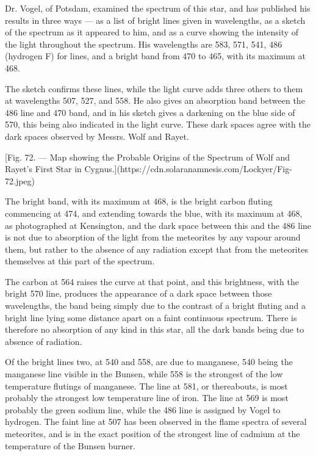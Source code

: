 \documentclass[a4paper, 12pt, oneside, polutonikogreek, english]{article}
\begin{document}
Dr. Vogel, of Potsdam, examined the spectrum of this star, and has published his results in three ways --- as a list of bright lines given in wavelengths, as a sketch of the spectrum as it appeared to him, and as a curve showing the intensity of the light throughout the spectrum. His wavelengths are 583, 571, 541, 486 (hydrogen F) for lines, and a bright band from 470 to 465, with its maximum at 468.

The sketch confirms these lines, while the light curve adds three others to them at wavelengths 507, 527, and 558. He also gives an absorption band between the 486 line and 470 band, and in his sketch gives a darkening on the blue side of 570, this being also indicated in the light curve. These dark spaces agree with the dark spaces observed by Messrs. Wolf and Rayet.

[Fig. 72. --- Map showing the Probable Origins of the Spectrum of Wolf and Rayet's First Star in Cygnus.](https://cdn.solaranamnesis.com/Lockyer/Fig-72.jpeg)

The bright band, with its maximum at 468, is the bright carbon fluting commencing at 474, and extending towards the blue, with its maximum at 468, as photographed at Kensington, and the dark space between this and the 486 line is not due to absorption of the light from the meteorites by any vapour around them, but rather to the absence of any radiation except that from the meteorites themselves at this part of the spectrum.

The carbon at 564 raises the curve at that point, and this brightness, with the bright 570 line, produces the appearance of a dark space between those wavelengths, the band being simply due to the contrast of a bright fluting and a bright line lying some distance apart on a faint continuous spectrum. There is therefore no absorption of any kind in this star, all the dark bands being due to absence of radiation.

Of the bright lines two, at 540 and 558, are due to manganese, 540 being the manganese line visible in the Bunsen, while 558 is the strongest of the low temperature flutings of manganese. The line at 581, or thereabouts, is most probably the strongest low temperature line of iron. The line at 569 is most probably the green sodium line, while the 486 line is assigned by Vogel to hydrogen. The faint line at 507 has been observed in the flame spectra of several meteorites, and is in the exact position of the strongest line of cadmium at the temperature of the Bunsen burner.
\end{document}
